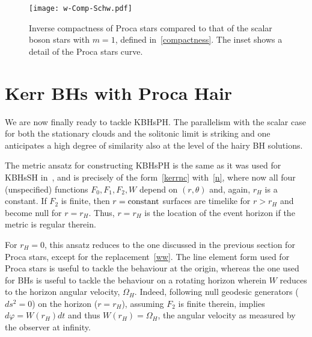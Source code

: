 \begin{figure}[h!]
  \begin{center}
    \texttt{[image: w-Comp-Schw.pdf]}  
         \end{center}
 \caption{Inverse compactness of Proca stars compared to that of the scalar boson stars with $m=1$, defined in~\eqref{compactness}. The inset shows a detail of the Proca stars curve.}
  \label{compactnessfig}
\end{figure}




\section{Kerr BHs with Proca Hair} 
\label{sec_kbhsph}
We are now finally ready to tackle KBHsPH. The parallelism with the scalar case for both the stationary clouds and the solitonic limit is striking and one anticipates a high degree of similarity also at the level of the hairy BH solutions. 

The metric ansatz for constructing KBHsPH is the same as it was used for KBHsSH in~\cite{Herdeiro:2014goa}, and is precisely of the form~\eqref{kerrnc} with~\eqref{n}, where now 
all four (unspecified) functions $F_0,F_1,F_2,W$ depend on $(r,\theta)$ and, again, $r_H$ is a constant. If $F_2$ is finite, then $r={\rm constant}$ surfaces are timelike for $r>r_H$ and become null for $r=r_H$. Thus, $r=r_H$ is the location of the event horizon if the metric is regular therein.

For $r_H=0$, this ansatz reduces to the one discussed in the previous section for Proca stars, except for the replacement~\eqref{ww}. The line element form used for Proca stars is useful to tackle the behaviour at the origin, whereas the one used for BHs is useful to tackle the behaviour on a rotating horizon wherein $W$ reduces to the horizon angular velocity, $\Omega_H$. Indeed, following null geodesic generators ($ds^2=0$) on the horizon ($r=r_H$), assuming $F_2$ is finite therein, implies $d\varphi=W(r_H)dt$ and thus $W(r_H)=\Omega_H$, the angular velocity as measured by the observer at infinity.

